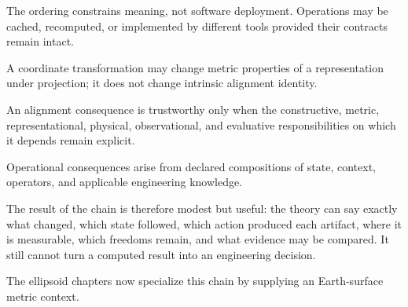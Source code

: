 The ordering constrains meaning, not software deployment. Operations may
be cached, recomputed, or implemented by different tools provided their
contracts remain intact.

\begin{proposition}
\label{prop:alignment-not-crs-invariant}
A coordinate transformation may change metric properties of a
representation under projection; it does not change intrinsic alignment
identity.
\end{proposition}

\begin{proposition}
\label{prop:alignment-multi-layer-system}
An alignment consequence is trustworthy only when the constructive,
metric, representational, physical, observational, and evaluative
responsibilities on which it depends remain explicit.
\end{proposition}

\begin{proposition}
\label{prop:operational-behaviour-emerges}
Operational consequences arise from declared compositions of state,
context, operators, and applicable engineering knowledge.
\end{proposition}

The result of the chain is therefore modest but useful: the theory can
say exactly what changed, which state followed, which action produced
each artifact, where it is measurable, which freedoms remain, and what
evidence may be compared. It still cannot turn a computed result into an
engineering decision.

The ellipsoid chapters now specialize this chain by supplying an
Earth-surface metric context.
